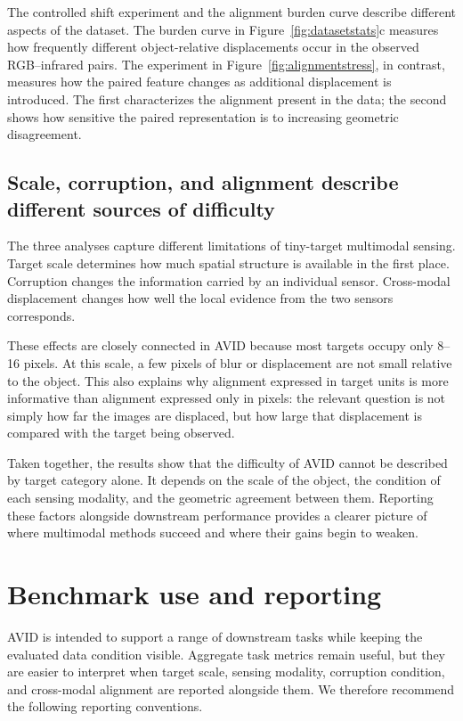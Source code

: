 \documentclass[10pt]{article}
\newcommand{\dataset}{\textsc{AVID}}
\begin{document}
The controlled shift experiment and the alignment burden curve describe different aspects of the dataset. The burden curve in Figure~\ref{fig:datasetstats}c measures how frequently different object-relative displacements occur in the observed RGB--infrared pairs. The experiment in Figure~\ref{fig:alignmentstress}, in contrast, measures how the paired feature changes as additional displacement is introduced. The first characterizes the alignment present in the data; the second shows how sensitive the paired representation is to increasing geometric disagreement.

\subsection{Scale, corruption, and alignment describe different sources of difficulty}

The three analyses capture different limitations of tiny-target multimodal sensing. Target scale determines how much spatial structure is available in the first place. Corruption changes the information carried by an individual sensor. Cross-modal displacement changes how well the local evidence from the two sensors corresponds.

These effects are closely connected in \dataset{} because most targets occupy only 8--16 pixels. At this scale, a few pixels of blur or displacement are not small relative to the object. This also explains why alignment expressed in target units is more informative than alignment expressed only in pixels: the relevant question is not simply how far the images are displaced, but how large that displacement is compared with the target being observed.

Taken together, the results show that the difficulty of \dataset{} cannot be described by target category alone. It depends on the scale of the object, the condition of each sensing modality, and the geometric agreement between them. Reporting these factors alongside downstream performance provides a clearer picture of where multimodal methods succeed and where their gains begin to weaken.

\section{Benchmark use and reporting}
\label{sec:protocol}

\dataset{} is intended to support a range of downstream tasks while keeping the evaluated data condition visible. Aggregate task metrics remain useful, but they are easier to interpret when target scale, sensing modality, corruption condition, and cross-modal alignment are reported alongside them. We therefore recommend the following reporting conventions.
\end{document}

